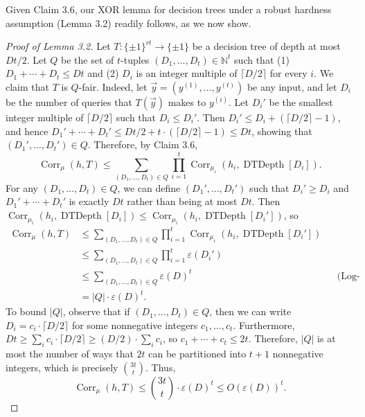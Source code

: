 \documentclass[10pt,a4paper]{article}
\newcommand{\Corr}{\operatorname{Corr}}
\newcommand{\DT}{\operatorname{DTDepth}}
\begin{document}
Given Claim 3.6, our XOR lemma for decision trees under a robust hardness assumption (Lemma 3.2) readily follows, as we now show.
\begin{proof}[Proof of Lemma 3.2]
Let $T:\{\pm1\}^{rt}\to\{\pm1\}$ be a decision tree of depth at most $Dt/2$. Let $Q$ be the set of $t$-tuples $(D_1,\ldots,D_t)\in\mathbb N^t$ such that (1) $D_1+\cdots+D_t\le Dt$ and (2) $D_i$ is an integer multiple of $\lceil D/2\rceil$ for every $i$. We claim that $T$ is $Q$-fair. Indeed, let $\vec y=(y^{(1)},\ldots,y^{(t)})$ be any input, and let $D_i$ be the number of queries that $T(\vec y)$ makes to $y^{(i)}$. Let $D_i'$ be the smallest integer multiple of $\lceil D/2\rceil$ such that $D_i\le D_i'$. Then $D_i'\le D_i+(\lceil D/2\rceil-1)$, and hence $D_1'+\cdots+D_t'\le Dt/2+t\cdot(\lceil D/2\rceil-1)\le Dt$, showing that $(D_1',\ldots,D_t')\in Q$.
Therefore, by Claim 3.6,
\[\Corr_\mu(h,T)\le\sum_{(D_1,\ldots,D_t)\in Q}\prod_{i=1}^t\Corr_{\mu_i}(h_i,\DT[D_i]).\]
For any $(D_1,\ldots,D_t)\in Q$, we can define $(D_1',\ldots,D_t')$ such that $D_i'\ge D_i$ and $D_1'+\cdots+D_t'$ is exactly $Dt$ rather than being at most $Dt$. Then $\Corr_{\mu_i}(h_i,\DT[D_i])\le\Corr_{\mu_i}(h_i,\DT[D_i'])$, so
\begin{align*}
\Corr_\mu(h,T)&\le\sum_{(D_1,\ldots,D_t)\in Q}\prod_{i=1}^t\Corr_{\mu_i}(h_i,\DT[D_i'])\\
&\le\sum_{(D_1,\ldots,D_t)\in Q}\prod_{i=1}^t\varepsilon(D_i')\\
&\le\sum_{(D_1,\ldots,D_t)\in Q}\varepsilon(D)^t&&\text{(Log-concavity)}\\
&=|Q|\cdot\varepsilon(D)^t.
\end{align*}
To bound $|Q|$, observe that if $(D_1,\ldots,D_t)\in Q$, then we can write $D_i=c_i\cdot\lceil D/2\rceil$ for some nonnegative integers $c_1,\ldots,c_t$. Furthermore, $Dt\ge\sum_i c_i\cdot\lceil D/2\rceil\ge(D/2)\cdot\sum_i c_i$, so $c_1+\cdots+c_t\le2t$. Therefore, $|Q|$ is at most the number of ways that $2t$ can be partitioned into $t+1$ nonnegative integers, which is precisely $\binom{3t}{t}$. Thus,
\[\Corr_\mu(h,T)\le\binom{3t}{t}\cdot\varepsilon(D)^t\le O(\varepsilon(D))^t.\]
\end{proof}
\end{document}
